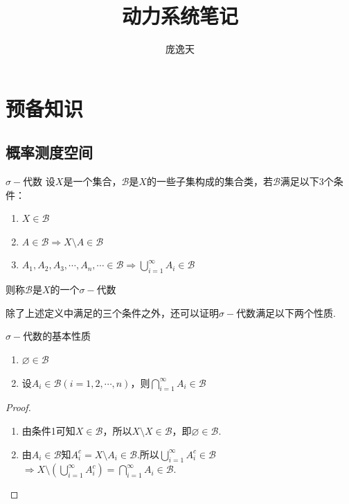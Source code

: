 \documentclass[lang=cn,a4paper,11pt,openany,scheme=chinese,twoside]{elegantbook}
\newcommand{\ForceRightPage}{%
  \clearpage
  \ifodd\value{page}\relax
  \else
    \hbox{}\thispagestyle{empty}\newpage
  \fi
}
\begin{document}
\title{动力系统笔记}
\author{庞逸天}
\date{}
\maketitle
\setcounter{page}{1}

\frontmatter
{}     %
\clearpage
\tableofcontents
\clearpage

\ForceRightPage
\mainmatter

\chapter{预备知识}

\section{概率测度空间}

\begin{definition}{$\sigma-$代数}
    设$X$是一个集合，$\mathcal{B}$是$X$的一些子集构成的集合类，若$\mathcal{B}$满足以下3个条件：
    \begin{enumerate}
        \item $X\in\mathcal{B}$
        \item $A\in\mathcal{B}\Rightarrow X\setminus A\in\mathcal{B}$
        \item $A_1,A_2,A_3,\cdots,A_n,\cdots\in\mathcal{B}\Rightarrow\bigcup_{i=1}^{\infty}{A_i\in\mathcal{B}}$
    \end{enumerate}
    则称$\mathcal{B}$是$X$的一个$\sigma-\text{代数}$
\end{definition}

除了上述定义中满足的三个条件之外，还可以证明$\sigma-\text{代数}$满足以下两个性质.

\begin{proposition}{$\sigma-\text{代数}$的基本性质}
    \begin{enumerate}
        \item $\varnothing\in\mathcal{B}$
        \item 设$A_i\in\mathcal{B}(i=1,2,\cdots,n)$，则$\bigcap_{i=1}^{\infty}{A_i}\in\mathcal{B}$   
    \end{enumerate}
\end{proposition}
\begin{proof}
    \begin{enumerate}
        \item 由条件1可知$X\in\mathcal{B}$，所以$X\setminus X\in\mathcal{B}$，即$\varnothing\in\mathcal{B}$.
        \item 由$A_i\in\mathcal{B}$知$A_i^c=X\setminus A_i \in\mathcal{B}$.所以$\bigcup_{i=1}^\infty{A_i^c}\in\mathcal{B}$
        $\Rightarrow X\setminus\left(\bigcup_{i=1}^\infty{A_i^c}\right)=\bigcap_{i=1}^\infty{A_i}\in\mathcal{B}$.
    \end{enumerate}
\end{proof}
\end{document}
